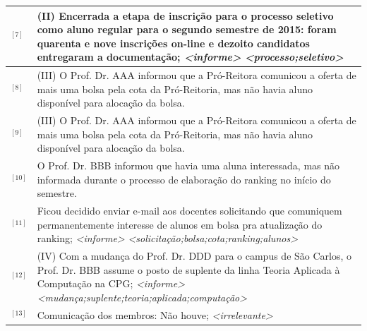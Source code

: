 \begin{table}[!h]
	\centering 
\footnotesize
	\begin{tabular}{|p{0.2cm}p{}|} \hline


$^{[7]}$&
(II) Encerrada a etapa de inscrição para o processo seletivo como aluno regular para o segundo semestre de 2015: foram quarenta e nove inscrições on-line e dezoito candidatos entregaram a documentação; 
\textit{<informe>} \textit{<processo;seletivo>}
\\ \hline


$^{[8]}$ &
(III) O Prof. Dr. AAA informou que a Pró-Reitora comunicou a oferta de mais uma bolsa pela cota da Pró-Reitoria, mas não havia aluno disponível para alocação da bolsa.\\
$^{[9]}$ &
(III) O Prof. Dr. AAA informou que a Pró-Reitora comunicou a oferta de mais uma bolsa pela cota da Pró-Reitoria, mas não havia aluno disponível para alocação da bolsa.\\
$^{[10]}$ &
O Prof. Dr. BBB informou que havia uma aluna interessada, mas não informada durante o processo de elaboração do ranking no início do semestre.\\
$^{[11]}$ &
Ficou decidido enviar e-mail aos docentes solicitando que comuniquem permanentemente interesse de alunos em bolsa pra atualização do ranking;
\textit{<informe>} \textit{<solicitação;bolsa;cota;ranking;alunos>}
\\ \hline


$^{[12]}$ &
(IV) Com a mudança do Prof. Dr. DDD para o campus de São Carlos, o Prof. Dr. BBB assume o posto de suplente da linha Teoria Aplicada à Computação na CPG;
\textit{<informe>} \textit{<mudança;suplente;teoria;aplicada;computação>}
\\ \hline

$^{[13]}$ &
	Comunicação dos membros: Não houve;
	\textit{<irrelevante>} 
\\ \hline







\end{tabular}
\end{table}
